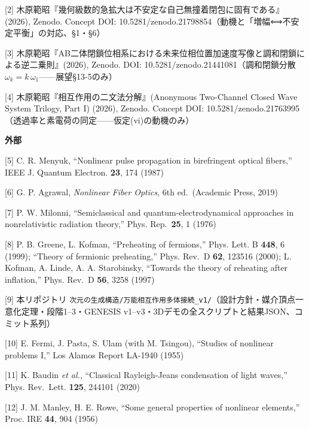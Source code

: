 \documentclass[
  a4paper,
]{ltjsarticle}
\begin{document}
{[}2{]}
木原範昭『幾何級数的急拡大は不安定な自己無撞着閉包に固有である』(2026),
Zenodo. Concept DOI:
10.5281/zenodo.21798854（動機と「増幅⟺不安定平衡」の対応、§1・§6）

{[}3{]}
木原範昭『AB二体閉鎖位相系における未来位相位置加速度写像と調和閉鎖による逆二乗則』(2026),
Zenodo. DOI: 10.5281/zenodo.21441081（調和閉鎖分散
\(\omega_k=k\,\omega_1\)------展望§13-5のみ）

{[}4{]} 木原範昭『相互作用の二文法分解』(Anonymous Two-Channel Closed
Wave System Trilogy, Part I) (2026), Zenodo. Concept DOI:
10.5281/zenodo.21763995（透過率と素電荷の同定------仮定(vi)の動機のみ）

\textbf{外部}

{[}5{]} C. R. Menyuk, ``Nonlinear pulse propagation in birefringent
optical fibers,'' IEEE J. Quantum Electron. \textbf{23}, 174 (1987)

{[}6{]} G. P. Agrawal, \emph{Nonlinear Fiber Optics}, 6th ed.~(Academic
Press, 2019)

{[}7{]} P. W. Milonni, ``Semiclassical and quantum-electrodynamical
approaches in nonrelativistic radiation theory,'' Phys.
Rep.~\textbf{25}, 1 (1976)

{[}8{]} P. B. Greene, L. Kofman, ``Preheating of fermions,'' Phys. Lett.
B \textbf{448}, 6 (1999); ``Theory of fermionic preheating,'' Phys.
Rev.~D \textbf{62}, 123516 (2000); L. Kofman, A. Linde, A. A.
Starobinsky, ``Towards the theory of reheating after inflation,'' Phys.
Rev.~D \textbf{56}, 3258 (1997)

{[}9{]} 本リポジトリ
\texttt{次元の生成構造/万能相互作用多体接続\_v1/}（設計方針・媒介頂点一意化定理・段階1--3・GENESIS
v1--v3・3Dデモの全スクリプトと結果JSON、コミット系列）

{[}10{]} E. Fermi, J. Pasta, S. Ulam (with M. Tsingou), ``Studies of
nonlinear problems I,'' Los Alamos Report LA-1940 (1955)

{[}11{]} K. Baudin \emph{et al.}, ``Classical Rayleigh-Jeans
condensation of light waves,'' Phys. Rev.~Lett. \textbf{125}, 244101
(2020)

{[}12{]} J. M. Manley, H. E. Rowe, ``Some general properties of
nonlinear elements,'' Proc. IRE \textbf{44}, 904 (1956)
\end{document}
